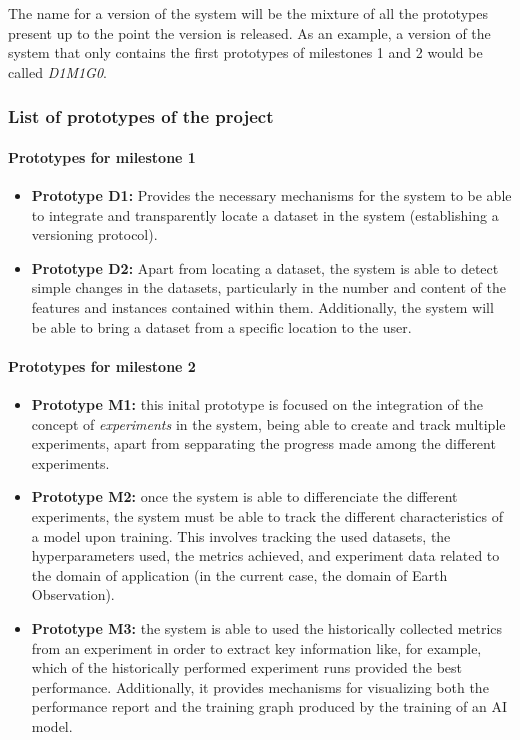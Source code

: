 The name for a version of the system will be the mixture of all the prototypes present up to the point the version is released. As an example, a version of the system that 
only contains the first prototypes of milestones 1 and 2 would be called \emph{D1M1G0}.

\subsubsection{List of prototypes of the project}

\paragraph{Prototypes for milestone 1}

\begin{itemize}
    \item \textbf{Prototype D1: }Provides the necessary mechanisms for the system to be able to integrate and transparently locate a dataset in the system (establishing a versioning protocol).

    \item \textbf{Prototype D2: }Apart from locating a dataset, the system is able to detect simple changes in the datasets, particularly in the number and content of the features and instances
    contained within them. Additionally, the system will be able to bring a dataset from a specific location to the user.
\end{itemize}

\paragraph{Prototypes for milestone 2}

\begin{itemize}
    \item \textbf{Prototype M1: }this inital prototype is focused on the integration of the concept of \emph{experiments} in the system, being able to create and track multiple 
    experiments, apart from sepparating the progress made among the different experiments.
    \item \textbf{Prototype M2: }once the system is able to differenciate the different experiments, the system must be able to track the different characteristics of a model
    upon training. This involves tracking the used datasets, the hyperparameters used, the metrics achieved, and experiment data related to the domain of application (in the 
    current case, the domain of Earth Observation).
    \item \textbf{Prototype M3: }the system is able to used the historically collected metrics from an experiment in order to extract key information like, for example, which
    of the historically performed experiment runs provided the best performance. Additionally, it provides mechanisms for visualizing both the performance report and the 
    training graph produced by the training of an \acrshort{AI} model.
\end{itemize}


